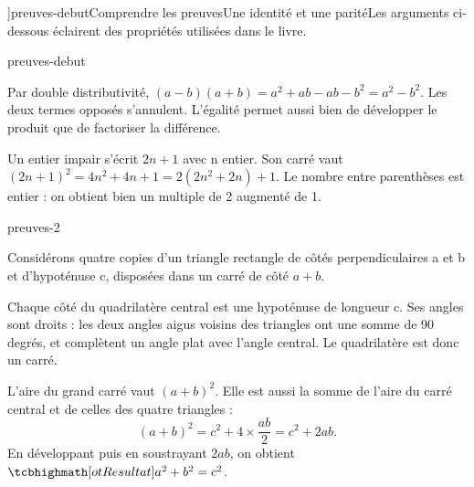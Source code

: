 \editionPage[\pdfbookmark[0]{Démonstrations}{bm-preuves-debut-parent}]{preuves-debut}{Comprendre les preuves}{Une identité et une parité}{Les arguments ci-dessous éclairent des propriétés utilisées dans le livre.}
\begin{blocEdition}{preuves-debut}

\begin{demonstration}
Par double distributivité, $(a-b)(a+b)=a^2+ab-ab-b^2=a^2-b^2$.
Les deux termes opposés s’annulent. L’égalité permet aussi bien de
développer le produit que de factoriser la différence.
\end{demonstration}
\begin{demonstration}
Un entier impair s’écrit $2n+1$ avec n entier. Son carré vaut
$(2n+1)^2=4n^2+4n+1=2(2n^2+2n)+1$. Le nombre entre parenthèses est entier :
on obtient bien un multiple de 2 augmenté de 1.
\end{demonstration}

\end{blocEdition}
\begin{blocEdition}{preuves-2}

Considérons quatre copies d’un triangle rectangle de côtés perpendiculaires
a et b et d’hypoténuse c, disposées dans un carré de côté $a+b$.
\begin{center}\end{center}
Chaque côté du quadrilatère central est une hypoténuse de longueur c.
Ses angles sont droits : les deux angles aigus voisins des triangles
ont une somme de 90 degrés, et complètent un angle plat avec l’angle central.
Le quadrilatère est donc un carré.\par\medskip
L’aire du grand carré vaut $(a+b)^2$. Elle est aussi la somme de l’aire
du carré central et de celles des quatre triangles :
\[
(a+b)^2=c^2+4\times\frac{ab}{2}=c^2+2ab.
\]
En développant puis en soustrayant $2ab$, on obtient
$\res{a^2+b^2=c^2}$.

\end{blocEdition}
